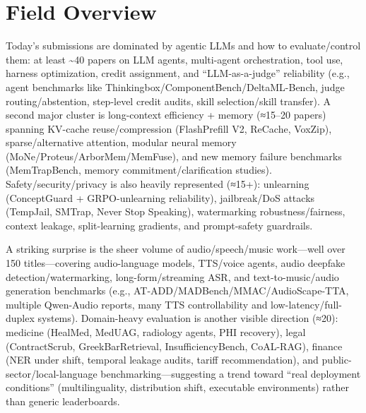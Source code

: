 \documentclass[12pt,letterpaper]{article}
\begin{document}
\section*{Field Overview}
{\footnotesize Today's submissions are dominated by agentic LLMs and how to evaluate/control them: at least \textasciitilde{}40 papers on LLM agents, multi-agent orchestration, tool use, harness optimization, credit assignment, and ``LLM-as-a-judge'' reliability (e.g., agent benchmarks like Thinkingbox/ComponentBench/DeltaML-Bench, judge routing/abstention, step-level credit audits, skill selection/skill transfer). A second major cluster is long-context efficiency + memory (≈15--20 papers) spanning KV-cache reuse/compression (FlashPrefill V2, ReCache, VoxZip), sparse/alternative attention, modular neural memory (MoNe/Proteus/ArborMem/MemFuse), and new memory failure benchmarks (MemTrapBench, memory commitment/clarification studies). Safety/security/privacy is also heavily represented (≈15+): unlearning (ConceptGuard + GRPO-unlearning reliability), jailbreak/DoS attacks (TempJail, SMTrap, Never Stop Speaking), watermarking robustness/fairness, context leakage, split-learning gradients, and prompt-safety guardrails.

A striking surprise is the sheer volume of audio/speech/music work---well over 150 titles---covering audio-language models, TTS/voice agents, audio deepfake detection/watermarking, long-form/streaming ASR, and text-to-music/audio generation benchmarks (e.g., AT-ADD/MADBench/MMAC/AudioScape-TTA, multiple Qwen-Audio reports, many TTS controllability and low-latency/full-duplex systems). Domain-heavy evaluation is another visible direction (≈20): medicine (HealMed, MedUAG, radiology agents, PHI recovery), legal (ContractScrub, GreekBarRetrieval, InsufficiencyBench, CoAL-RAG), finance (NER under shift, temporal leakage audits, tariff recommendation), and public-sector/local-language benchmarking---suggesting a trend toward ``real deployment conditions'' (multilinguality, distribution shift, executable environments) rather than generic leaderboards.}
\end{document}
